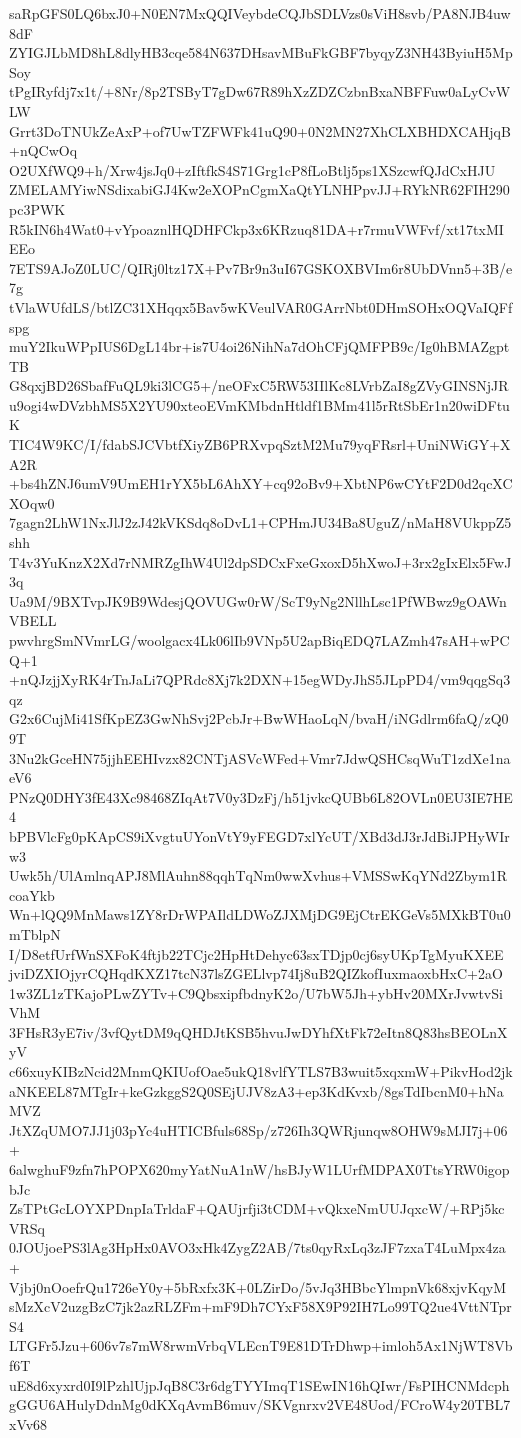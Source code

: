 saRpGFS0LQ6bxJ0+N0EN7MxQQIVeybdeCQJbSDLVzs0sViH8svb/PA8NJB4uw8dF
ZYIGJLbMD8hL8dlyHB3cqe584N637DHsavMBuFkGBF7byqyZ3NH43ByiuH5MpSoy
tPgIRyfdj7x1t/+8Nr/8p2TSByT7gDw67R89hXzZDZCzbnBxaNBFFuw0aLyCvWLW
Grrt3DoTNUkZeAxP+of7UwTZFWFk41uQ90+0N2MN27XhCLXBHDXCAHjqB+nQCwOq
O2UXfWQ9+h/Xrw4jsJq0+zIftfkS4S71Grg1cP8fLoBtlj5ps1XSzcwfQJdCxHJU
ZMELAMYiwNSdixabiGJ4Kw2eXOPnCgmXaQtYLNHPpvJJ+RYkNR62FIH290pc3PWK
R5kIN6h4Wat0+vYpoaznlHQDHFCkp3x6KRzuq81DA+r7rmuVWFvf/xt17txMIEEo
7ETS9AJoZ0LUC/QIRj0ltz17X+Pv7Br9n3uI67GSKOXBVIm6r8UbDVnn5+3B/e7g
tVlaWUfdLS/btlZC31XHqqx5Bav5wKVeulVAR0GArrNbt0DHmSOHxOQVaIQFfspg
muY2IkuWPpIUS6DgL14br+is7U4oi26NihNa7dOhCFjQMFPB9c/Ig0hBMAZgptTB
G8qxjBD26SbafFuQL9ki3lCG5+/neOFxC5RW53IIlKc8LVrbZaI8gZVyGINSNjJR
u9ogi4wDVzbhMS5X2YU90xteoEVmKMbdnHtldf1BMm41l5rRtSbEr1n20wiDFtuK
TIC4W9KC/I/fdabSJCVbtfXiyZB6PRXvpqSztM2Mu79yqFRsrl+UniNWiGY+XA2R
+bs4hZNJ6umV9UmEH1rYX5bL6AhXY+cq92oBv9+XbtNP6wCYtF2D0d2qcXCXOqw0
7gagn2LhW1NxJlJ2zJ42kVKSdq8oDvL1+CPHmJU34Ba8UguZ/nMaH8VUkppZ5shh
T4v3YuKnzX2Xd7rNMRZgIhW4Ul2dpSDCxFxeGxoxD5hXwoJ+3rx2gIxElx5FwJ3q
Ua9M/9BXTvpJK9B9WdesjQOVUGw0rW/ScT9yNg2NllhLsc1PfWBwz9gOAWnVBELL
pwvhrgSmNVmrLG/woolgacx4Lk06lIb9VNp5U2apBiqEDQ7LAZmh47sAH+wPCQ+1
+nQJzjjXyRK4rTnJaLi7QPRdc8Xj7k2DXN+15egWDyJhS5JLpPD4/vm9qqgSq3qz
G2x6CujMi41SfKpEZ3GwNhSvj2PcbJr+BwWHaoLqN/bvaH/iNGdlrm6faQ/zQ09T
3Nu2kGceHN75jjhEEHIvzx82CNTjASVcWFed+Vmr7JdwQSHCsqWuT1zdXe1naeV6
PNzQ0DHY3fE43Xc98468ZIqAt7V0y3DzFj/h51jvkcQUBb6L82OVLn0EU3IE7HE4
bPBVlcFg0pKApCS9iXvgtuUYonVtY9yFEGD7xlYcUT/XBd3dJ3rJdBiJPHyWIrw3
Uwk5h/UlAmlnqAPJ8MlAuhn88qqhTqNm0wwXvhus+VMSSwKqYNd2Zbym1RcoaYkb
Wn+lQQ9MnMaws1ZY8rDrWPAIldLDWoZJXMjDG9EjCtrEKGeVs5MXkBT0u0mTblpN
I/D8etfUrfWnSXFoK4ftjb22TCjc2HpHtDehyc63sxTDjp0cj6syUKpTgMyuKXEE
jviDZXIOjyrCQHqdKXZ17tcN37lsZGELlvp74Ij8uB2QIZkofIuxmaoxbHxC+2aO
1w3ZL1zTKajoPLwZYTv+C9QbsxipfbdnyK2o/U7bW5Jh+ybHv20MXrJvwtvSiVhM
3FHsR3yE7iv/3vfQytDM9qQHDJtKSB5hvuJwDYhfXtFk72eItn8Q83hsBEOLnXyV
c66xuyKIBzNcid2MnmQKIUofOae5ukQ18vlfYTLS7B3wuit5xqxmW+PikvHod2jk
aNKEEL87MTgIr+keGzkggS2Q0SEjUJV8zA3+ep3KdKvxb/8gsTdIbcnM0+hNaMVZ
JtXZqUMO7JJ1j03pYc4uHTICBfuls68Sp/z726Ih3QWRjunqw8OHW9sMJI7j+06+
6alwghuF9zfn7hPOPX620myYatNuA1nW/hsBJyW1LUrfMDPAX0TtsYRW0igopbJc
ZsTPtGcLOYXPDnpIaTrldaF+QAUjrfji3tCDM+vQkxeNmUUJqxcW/+RPj5kcVRSq
0JOUjoePS3lAg3HpHx0AVO3xHk4ZygZ2AB/7ts0qyRxLq3zJF7zxaT4LuMpx4za+
Vjbj0nOoefrQu1726eY0y+5bRxfx3K+0LZirDo/5vJq3HBbcYlmpnVk68xjvKqyM
sMzXcV2uzgBzC7jk2azRLZFm+mF9Dh7CYxF58X9P92IH7Lo99TQ2ue4VttNTprS4
LTGFr5Jzu+606v7s7mW8rwmVrbqVLEcnT9E81DTrDhwp+imloh5Ax1NjWT8Vbf6T
uE8d6xyxrd0I9lPzhlUjpJqB8C3r6dgTYYImqT1SEwIN16hQIwr/FsPIHCNMdcph
gGGU6AHulyDdnMg0dKXqAvmB6muv/SKVgnrxv2VE48Uod/FCroW4y20TBL7xVv68
